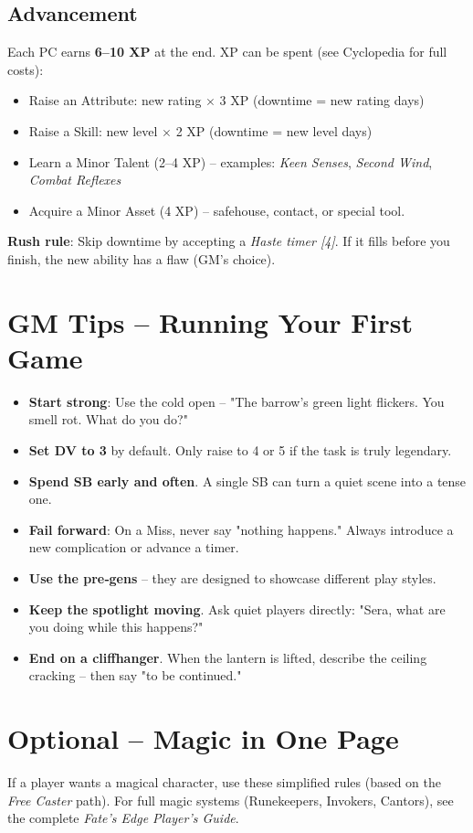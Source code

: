 \documentclass[10pt, twocolumn]{article}
\begin{document}
\subsection*{Advancement}
Each PC earns \textbf{6--10 XP} at the end. XP can be spent (see Cyclopedia for full costs):
\begin{itemize}
\item Raise an Attribute: new rating $\times$ 3 XP (downtime = new rating days)
\item Raise a Skill: new level $\times$ 2 XP (downtime = new level days)
\item Learn a Minor Talent (2--4 XP) -- examples: \textit{Keen Senses}, \textit{Second Wind}, \textit{Combat Reflexes}
\item Acquire a Minor Asset (4 XP) -- safehouse, contact, or special tool.
\end{itemize}
\textbf{Rush rule}: Skip downtime by accepting a \textit{Haste timer [4]}. If it fills before you finish, the new ability has a flaw (GM's choice).

\section{GM Tips -- Running Your First Game}
\begin{itemize}
\item \textbf{Start strong}: Use the cold open -- "The barrow's green light flickers. You smell rot. What do you do?"
\item \textbf{Set DV to 3} by default. Only raise to 4 or 5 if the task is truly legendary.
\item \textbf{Spend SB early and often}. A single SB can turn a quiet scene into a tense one.
\item \textbf{Fail forward}: On a Miss, never say "nothing happens." Always introduce a new complication or advance a timer.
\item \textbf{Use the pre‑gens} -- they are designed to showcase different play styles.
\item \textbf{Keep the spotlight moving}. Ask quiet players directly: "Sera, what are you doing while this happens?"
\item \textbf{End on a cliffhanger}. When the lantern is lifted, describe the ceiling cracking -- then say "to be continued."
\end{itemize}

\section*{Optional -- Magic in One Page}
If a player wants a magical character, use these simplified rules (based on the \textit{Free Caster} path). For full magic systems (Runekeepers, Invokers, Cantors), see the complete \textit{Fate's Edge Player's Guide}.
\end{document}
